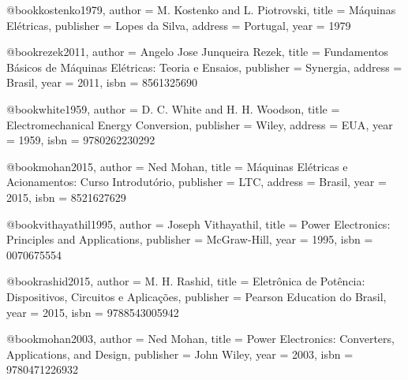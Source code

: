 @book{kostenko1979,
  author = {M. Kostenko and L. Piotrovski},
  title = {Máquinas Elétricas},
  publisher = {Lopes da Silva},
  address = {Portugal},
  year = {1979}
}

@book{rezek2011,
  author = {Angelo Jose Junqueira Rezek},
  title = {Fundamentos Básicos de Máquinas Elétricas: Teoria e Ensaios},
  publisher = {Synergia},
  address = {Brasil},
  year = {2011},
  isbn = {8561325690}
}

@book{white1959,
  author = {D. C. White and H. H. Woodson},
  title = {Electromechanical Energy Conversion},
  publisher = {Wiley},
  address = {EUA},
  year = {1959},
  isbn = {9780262230292}
}

@book{mohan2015,
  author = {Ned Mohan},
  title = {Máquinas Elétricas e Acionamentos: Curso Introdutório},
  publisher = {LTC},
  address = {Brasil},
  year = {2015},
  isbn = {8521627629}
}

%

@book{vithayathil1995,
  author = {Joseph Vithayathil},
  title = {Power Electronics: Principles and Applications},
  publisher = {McGraw-Hill},
  year = {1995},
  isbn = {0070675554}
}

@book{rashid2015,
  author = {M. H. Rashid},
  title = {Eletrônica de Potência: Dispositivos, Circuitos e Aplicações},
  publisher = {Pearson Education do Brasil},
  year = {2015},
  isbn = {9788543005942}
}

@book{mohan2003,
  author = {Ned Mohan},
  title = {Power Electronics: Converters, Applications, and Design},
  publisher = {John Wiley},
  year = {2003},
  isbn = {9780471226932}
}

